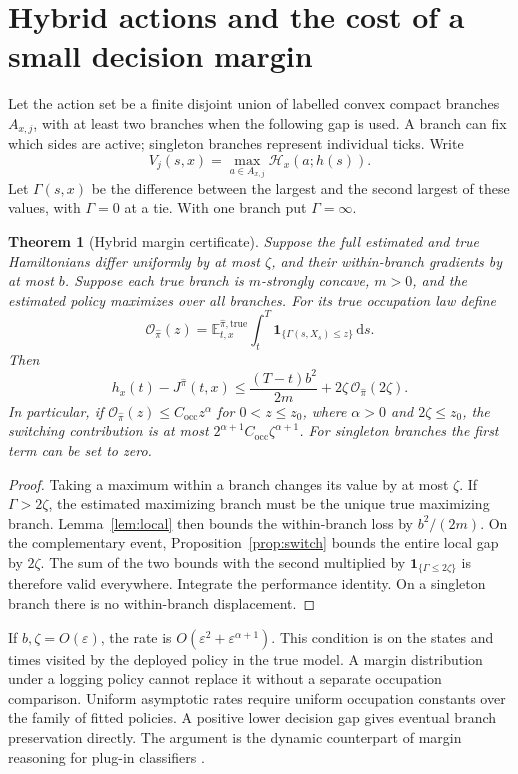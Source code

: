 \documentclass[11pt]{article}
\theoremstyle{plain}
\newtheorem{theorem}{Theorem}[section]
\theoremstyle{definition}
\theoremstyle{remark}
\newcommand{\E}{\mathbb E}
\newcommand{\dd}{\,\mathrm d}
\newcommand{\HH}{\mathcal H}
\begin{document}
\section{Hybrid actions and the cost of a small decision margin}

Let the action set be a finite disjoint union of labelled convex
compact branches \(A_{x,j}\), with at least two branches when the
following gap is used. A branch can fix which sides are active;
singleton branches represent individual ticks. Write
\[
V_j(s,x)=\max_{a\in A_{x,j}}\HH_x(a;h(s)).
\]
Let \(\Gamma(s,x)\) be the difference between the largest and the
second largest of these values, with \(\Gamma=0\) at a tie.
With one branch put \(\Gamma=\infty\).

\begin{theorem}[Hybrid margin certificate]\label{thm:hybrid}
Suppose the full estimated and true Hamiltonians differ uniformly
by at most \(\zeta\), and their within-branch gradients by at most
\(b\). Suppose each true branch is \(m\)-strongly concave,
\(m>0\), and the estimated policy maximizes over all branches.
For its true occupation law define
\[
\mathcal O_{\widehat\pi}(z)=
\E^{\widehat\pi,\mathrm{true}}_{t,x}
\int_t^T\mathbf1_{\{\Gamma(s,X_s)\le z\}}\dd s .
\]
Then
\begin{equation}\label{eq:hybrid}
h_x(t)-J^{\widehat\pi}(t,x)
\le \frac{(T-t)b^2}{2m}
       +2\zeta\,\mathcal O_{\widehat\pi}(2\zeta).
\end{equation}
In particular, if
\(\mathcal O_{\widehat\pi}(z)\le C_{\mathrm{occ}}z^\alpha\)
for \(0<z\le z_0\), where \(\alpha>0\) and \(2\zeta\le z_0\), the
switching contribution is at most
\(2^{\alpha+1}C_{\mathrm{occ}}\zeta^{\alpha+1}\).
For singleton branches the first term can be set to zero.
\end{theorem}
\begin{proof}
Taking a maximum within a branch changes its value by at most
\(\zeta\). If \(\Gamma>2\zeta\), the estimated maximizing branch
must be the unique true maximizing branch. Lemma~\ref{lem:local}
then bounds the within-branch loss by \(b^2/(2m)\).
On the complementary event, Proposition~\ref{prop:switch} bounds
the entire local gap by \(2\zeta\).
The sum of the two bounds with the second multiplied by
\(\mathbf1_{\{\Gamma\le2\zeta\}}\) is therefore valid everywhere.
Integrate the performance identity. On a singleton branch there
is no within-branch displacement.
\end{proof}

If \(b,\zeta=O(\varepsilon)\), the rate is
\(O(\varepsilon^2+\varepsilon^{\alpha+1})\).
This condition is on the states and times visited by the deployed
policy in the true model. A margin distribution under a logging policy
cannot replace it without a separate occupation comparison.
Uniform asymptotic rates require uniform occupation constants over
the family of fitted policies. A positive lower decision gap gives
eventual branch preservation directly.
The argument is the dynamic counterpart of margin reasoning for
plug-in classifiers \citep{AudibertTsybakov2007}.
\end{document}
